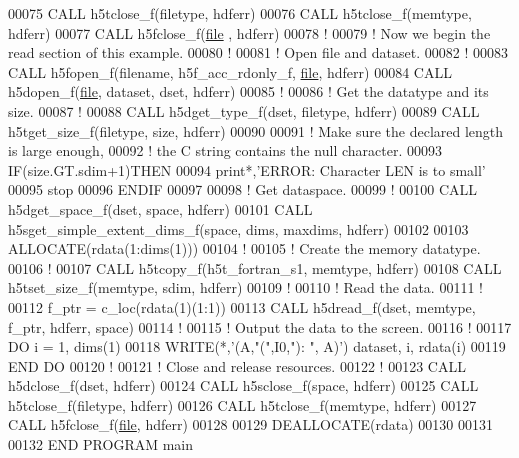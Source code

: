 \begin{DoxyCode}
00075   \textcolor{keyword}{CALL }h5tclose\_f(filetype, hdferr)
00076   \textcolor{keyword}{CALL }h5tclose\_f(memtype, hdferr)
00077   \textcolor{keyword}{CALL }h5fclose\_f(\hyperlink{structfile}{file} , hdferr)
00078   \textcolor{comment}{!}
00079   \textcolor{comment}{! Now we begin the read section of this example.}
00080   \textcolor{comment}{!}
00081   \textcolor{comment}{! Open file and dataset.}
00082   \textcolor{comment}{!}
00083   \textcolor{keyword}{CALL }h5fopen\_f(filename, h5f\_acc\_rdonly\_f, \hyperlink{structfile}{file}, hdferr)
00084   \textcolor{keyword}{CALL }h5dopen\_f(\hyperlink{structfile}{file}, dataset, dset, hdferr)
00085   \textcolor{comment}{!}
00086   \textcolor{comment}{! Get the datatype and its size.}
00087   \textcolor{comment}{!}
00088   \textcolor{keyword}{CALL }h5dget\_type\_f(dset, filetype, hdferr)
00089   \textcolor{keyword}{CALL }h5tget\_size\_f(filetype, \textcolor{keyword}{size}, hdferr)
00090 
00091   \textcolor{comment}{! Make sure the declared length is large enough,}
00092   \textcolor{comment}{! the C string contains the null character.}
00093   \textcolor{keywordflow}{IF}(size.GT.sdim+1)\textcolor{keywordflow}{THEN}
00094      print*,\textcolor{stringliteral}{'ERROR: Character LEN is to small'}
00095      stop
00096 \textcolor{keywordflow}{  ENDIF}
00097 
00098   \textcolor{comment}{! Get dataspace.}
00099   \textcolor{comment}{!}
00100   \textcolor{keyword}{CALL }h5dget\_space\_f(dset, space, hdferr)
00101   \textcolor{keyword}{CALL }h5sget\_simple\_extent\_dims\_f(space, dims, maxdims, hdferr)
00102 
00103   \textcolor{keyword}{ALLOCATE}(rdata(1:dims(1)))
00104   \textcolor{comment}{!}
00105   \textcolor{comment}{! Create the memory datatype.}
00106   \textcolor{comment}{!}
00107   \textcolor{keyword}{CALL }h5tcopy\_f(h5t\_fortran\_s1, memtype, hdferr)
00108   \textcolor{keyword}{CALL }h5tset\_size\_f(memtype, sdim, hdferr)
00109   \textcolor{comment}{!}
00110   \textcolor{comment}{! Read the data.}
00111   \textcolor{comment}{!}
00112   f\_ptr = c\_loc(rdata(1)(1:1))
00113   \textcolor{keyword}{CALL }h5dread\_f(dset, memtype, f\_ptr, hdferr, space)
00114   \textcolor{comment}{!}
00115   \textcolor{comment}{! Output the data to the screen.}
00116   \textcolor{comment}{!}
00117   \textcolor{keywordflow}{DO} i = 1, dims(1)
00118      \textcolor{keyword}{WRITE}(*,\textcolor{stringliteral}{'(A,"(",I0,"): ", A)'}) dataset, i, rdata(i)
00119 \textcolor{keywordflow}{  END DO}
00120   \textcolor{comment}{!}
00121   \textcolor{comment}{! Close and release resources.}
00122   \textcolor{comment}{!}
00123   \textcolor{keyword}{CALL }h5dclose\_f(dset, hdferr)
00124   \textcolor{keyword}{CALL }h5sclose\_f(space, hdferr)
00125   \textcolor{keyword}{CALL }h5tclose\_f(filetype, hdferr)
00126   \textcolor{keyword}{CALL }h5tclose\_f(memtype, hdferr)
00127   \textcolor{keyword}{CALL }h5fclose\_f(\hyperlink{structfile}{file}, hdferr)
00128 
00129   \textcolor{keyword}{DEALLOCATE}(rdata)
00130 
00131 
00132 \textcolor{keyword}{END PROGRAM }main
\end{DoxyCode}
